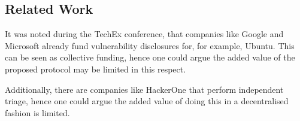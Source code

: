 \subsection{Related Work}
It was noted during the TechEx conference, that companies like Google and Microsoft already fund vulnerability disclosures for, for example, Ubuntu. This can be seen as collective funding, hence one could argue the added value of the proposed protocol may be limited in this respect.

Additionally, there are companies like HackerOne that perform independent triage, hence one could argue the added value of doing this in a decentralised fashion is limited.